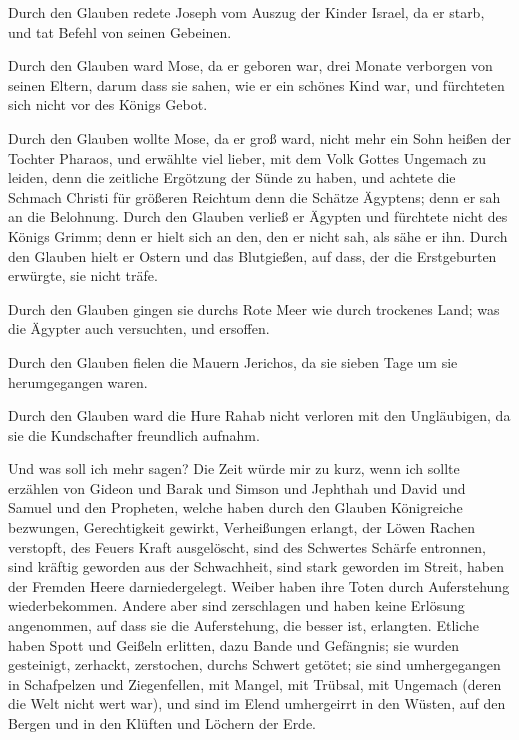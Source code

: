 Durch den Glauben redete Joseph vom Auszug der Kinder
Israel, da er starb, und tat Befehl von seinen Gebeinen.

 Durch den Glauben ward Mose, da er geboren war, drei
Monate verborgen von seinen Eltern, darum dass sie sahen, wie er ein
schönes Kind war, und fürchteten sich nicht vor des Königs Gebot.

 Durch den Glauben wollte Mose, da er groß ward, nicht
mehr ein Sohn heißen der Tochter Pharaos,  und erwählte
viel lieber, mit dem Volk Gottes Ungemach zu leiden, denn die zeitliche
Ergötzung der Sünde zu haben,  und achtete die Schmach
Christi für größeren Reichtum denn die Schätze Ägyptens; denn er sah an
die Belohnung.  Durch den Glauben verließ er Ägypten und
fürchtete nicht des Königs Grimm; denn er hielt sich an den, den er
nicht sah, als sähe er ihn.  Durch den Glauben hielt er
Ostern und das Blutgießen, auf dass, der die Erstgeburten erwürgte, sie
nicht träfe.

 Durch den Glauben gingen sie durchs Rote Meer wie durch
trockenes Land; was die Ägypter auch versuchten, und ersoffen.

 Durch den Glauben fielen die Mauern Jerichos, da sie
sieben Tage um sie herumgegangen waren.

 Durch den Glauben ward die Hure Rahab nicht verloren mit
den Ungläubigen, da sie die Kundschafter freundlich aufnahm.

 Und was soll ich mehr sagen? Die Zeit würde mir zu kurz,
wenn ich sollte erzählen von Gideon und Barak und Simson und Jephthah
und David und Samuel und den Propheten,  welche haben
durch den Glauben Königreiche bezwungen, Gerechtigkeit gewirkt,
Verheißungen erlangt, der Löwen Rachen verstopft,  des
Feuers Kraft ausgelöscht, sind des Schwertes Schärfe entronnen, sind
kräftig geworden aus der Schwachheit, sind stark geworden im Streit,
haben der Fremden Heere darniedergelegt.  Weiber haben
ihre Toten durch Auferstehung wiederbekommen. Andere aber sind
zerschlagen und haben keine Erlösung angenommen, auf dass sie die
Auferstehung, die besser ist, erlangten.  Etliche haben
Spott und Geißeln erlitten, dazu Bande und Gefängnis; 
sie wurden gesteinigt, zerhackt, zerstochen, durchs Schwert getötet; sie
sind umhergegangen in Schafpelzen und Ziegenfellen, mit Mangel, mit
Trübsal, mit Ungemach  (deren die Welt nicht wert war),
und sind im Elend umhergeirrt in den Wüsten, auf den Bergen und in den
Klüften und Löchern der Erde.

